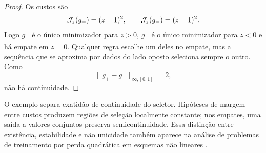 \begin{proof}
Os custos são
\[
 \mathcal{J}_z(g_+)=(z-1)^2,\qquad
 \mathcal{J}_z(g_-)=(z+1)^2.
\]
Logo $g_+$ é o único minimizador para $z>0$, $g_-$ é o único minimizador para
$z<0$ e há empate em $z=0$. Qualquer regra escolhe um deles no empate, mas a
sequência que se aproxima por dados do lado oposto seleciona sempre o outro.
Como
\[
 \|g_+-g_-\|_{\infty,[0,1]}=2,
\]
não há continuidade.
\end{proof}

O exemplo separa exatidão de continuidade do seletor. Hipóteses de margem
entre custos produzem regiões de seleção localmente constante; nos empates,
uma saída a valores conjuntos preserva semicontinuidade. Essa distinção entre
existência, estabilidade e não unicidade também aparece na análise de problemas
de treinamento por perda quadrática em esquemas não lineares
\citep{christof2021}.
